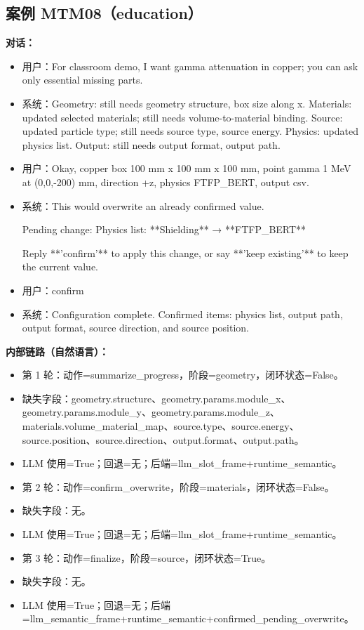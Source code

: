 \documentclass[11pt]{ctexart}
\begin{document}
\subsection{案例 MTM08（education）}
\textbf{对话：}
\begin{itemize}
\item 用户：For classroom demo, I want gamma attenuation in copper; you can ask only essential missing parts.
\item 系统：Geometry: still needs geometry structure, box size along x. Materials: updated selected materials; still needs volume-to-material binding. Source: updated particle type; still needs source type, source energy. Physics: updated physics list. Output: still needs output format, output path.
\item 用户：Okay, copper box 100 mm x 100 mm x 100 mm, point gamma 1 MeV at (0,0,-200) mm, direction +z, physics FTFP\_BERT, output csv.
\item 系统：This would overwrite an already confirmed value.

Pending change:
Physics list: **Shielding** → **FTFP\_BERT**

Reply **'confirm'** to apply this change, or say **'keep existing'** to keep the current value.
\item 用户：confirm
\item 系统：Configuration complete. Confirmed items: physics list, output path, output format, source direction, and source position.
\end{itemize}
\textbf{内部链路（自然语言）：}
\begin{itemize}
\item 第 1 轮：动作=summarize\_progress，阶段=geometry，闭环状态=False。
\item 缺失字段：geometry.structure、geometry.params.module\_x、geometry.params.module\_y、geometry.params.module\_z、materials.volume\_material\_map、source.type、source.energy、source.position、source.direction、output.format、output.path。
\item LLM 使用=True；回退=无；后端=llm\_slot\_frame+runtime\_semantic。
\item 第 2 轮：动作=confirm\_overwrite，阶段=materials，闭环状态=False。
\item 缺失字段：无。
\item LLM 使用=True；回退=无；后端=llm\_slot\_frame+runtime\_semantic。
\item 第 3 轮：动作=finalize，阶段=source，闭环状态=True。
\item 缺失字段：无。
\item LLM 使用=True；回退=无；后端=llm\_semantic\_frame+runtime\_semantic+confirmed\_pending\_overwrite。
\end{itemize}
\end{document}

